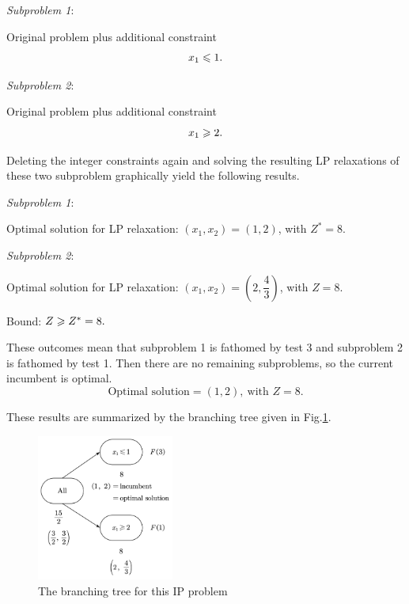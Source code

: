 \documentclass[a4paper]{article}
\begin{document}
\begin{enumerate}
\begin{solution}
	\textit{Subproblem 1}:
	
	Original problem plus additional constraint $$x_1\leqslant 1.$$
	
	\textit{Subproblem 2}:
	
	Original problem plus additional constraint $$x_1\geqslant 2.$$
	
	Deleting the integer constraints again and solving the resulting LP relaxations of these two subproblem graphically yield the following results.
	
	\textit{Subproblem 1}:
	
	\hspace*{4ex}Optimal solution for LP relaxation: $(x_1,x_2)=(1,2 )$, with $Z^*=8.$
	
	\textit{Subproblem 2}:
	
	\hspace*{4ex}Optimal solution for LP relaxation: $(x_1,x_2)=\left( 2,\dfrac{4}{3}\right) $, with $Z=8.$
	
	\hspace*{4ex}Bound: $Z\geqslant Z^*=8.$
	
	\hspace*{4ex}These outcomes mean that subproblem 1 is fathomed by test 3 and subproblem 2 is fathomed by test 1. Then there are no remaining subproblems, so the current incumbent is optimal.
	\begin{equation*}
	\text{Optimal solution}=(1,2),\ \text{with } Z=8.
	\end{equation*}
	
	\hspace*{4ex}These results are summarized by the branching tree given in Fig.\ref{f1}.
	
	\begin{figure}[htbp]
		\centering
		\includegraphics[width = 0.4\textwidth]{f1}
		\caption{The branching tree for this IP problem}
		\label{f1}
	\end{figure}
	
\end{solution}
\vspace*{-1cm}


\end{enumerate}
\end{document}
